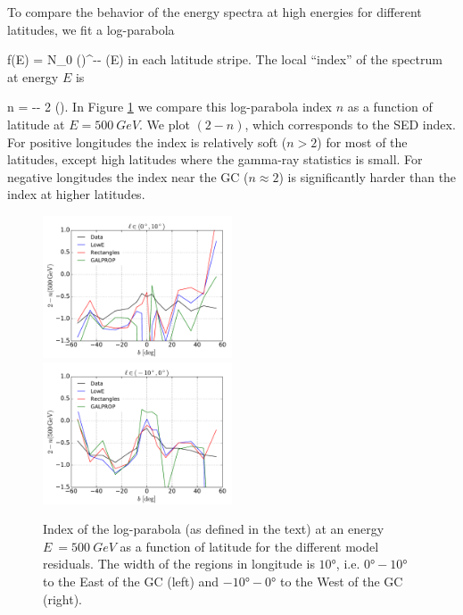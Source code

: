 To compare the behavior of the energy spectra at high energies for different latitudes, 
we fit a log-parabola

 \be
 f(E) = N_0 \left(\right)^{-\alpha - \beta \ln(E)}
 \ee
in each latitude stripe. The local ``index'' of the spectrum at energy $E$ is

 \be 
n \equiv {} = -\alpha - 2 \beta \ln\left(\right).
 \ee
In Figure \ref{fig:logpar_index} we compare this log-parabola index $n$ as a function of latitude at $E = \SI{500}{GeV}$. 
We plot $(2 - n)$, which corresponds to the SED index.
For positive longitudes the index is relatively soft ($n > 2$) for most of the latitudes, 
except high latitudes where the gamma-ray statistics is small.
For negative longitudes the index near the GC ($n \approx 2$) 
is significantly harder than the index at higher latitudes.
\begin{figure}[h!]
\includegraphics[width=0.5\textwidth]{plots/LogParabola_n(500GeV)_l_in_(0,10).pdf}
\includegraphics[width=0.5\textwidth]{plots/LogParabola_n(500GeV)_l_in_(-10,0).pdf}
  	\caption{Index of the log-parabola (as defined in the text) at an energy $E\ = \SI{500}{GeV}$ as a function of latitude for the different model residuals. The width of the regions in longitude is $\ang{10}$, i.e. $\ang{0} - \ang{10}$ to the East of the GC (left) and $\ang{-10} - \ang{0}$ to the West of the GC (right).}
  	\label{fig:logpar_index}
\end{figure}




